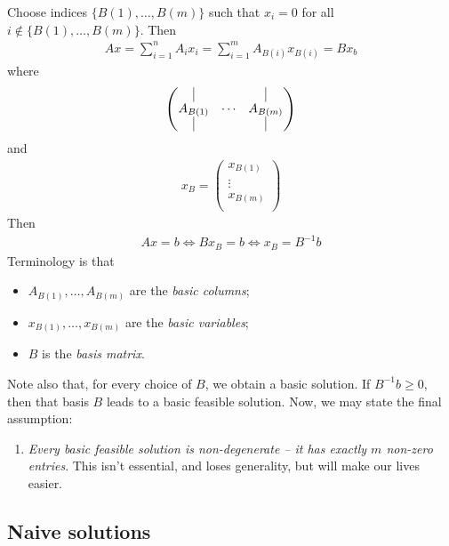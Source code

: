 \documentclass{../template/note}
\begin{document}
    Choose indices $\{B(1), \dots, B(m)\}$ such that $x_i = 0$ for all $i \notin \{B(1), \dots, B(m)\}$. Then
    \begin{align*}
        Ax = \sum_{i=1}^n A_ix_i = \sum_{i=1}^m A_{B(i)}x_{B(i)} = Bx_b
    \end{align*}
    where
    \begin{align*}
        \begin{pmatrix}
            \vline & & \vline \\ 
            A_{B(1)} & \cdots & A_{B(m)} \\
            \vline & & \vline \\ 
        \end{pmatrix}
    \end{align*}
    and
    \begin{align*}
        x_B = \begin{pmatrix}
            x_{B(1)} \\
            \vdots \\
            x_{B(m)} \\
        \end{pmatrix}
    \end{align*}
    Then
    \begin{align*}
        Ax = b \iff Bx_B = b \iff x_B = B^{-1}b
    \end{align*}
    Terminology is that
    \begin{itemize}
        \item $A_{B(1)}, \dots, A_{B(m)}$ are the \emph{basic columns};
        \item $x_{B(1)}, \dots, x_{B(m)}$ are the \emph{basic variables};
        \item $B$ is the \emph{basis matrix}.
    \end{itemize}
    Note also that, for every choice of $B$, we obtain a basic solution. If $B^{-1}b \geq 0$, then that basis $B$ leads to a basic feasible solution. Now, we may state the final assumption:
    \begin{enumerate}[resume, label=\protect\circled{\arabic*}] 
        \item \emph{Every basic feasible solution is non-degenerate -- it has exactly $m$ non-zero entries}. This isn't essential, and loses generality, but will make our lives easier.
    \end{enumerate}
    
    \subsection{Naive solutions}
\end{document}
